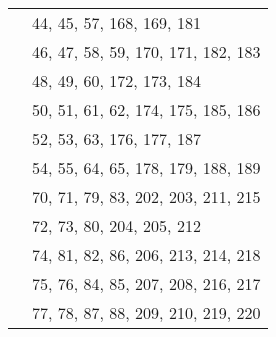 \begin{center}
\begin{longtabu}{|X[l]|X[2,l]|}
    &44, 45, 57, 168, 169, 181\\
    &46, 47, 58, 59, 170, 171, 182, 183\\
    &48, 49, 60, 172, 173, 184\\
    &50, 51, 61, 62, 174, 175, 185, 186\\
    &52, 53, 63, 176, 177, 187\\
    &54, 55, 64, 65, 178, 179, 188, 189\\
    &70, 71, 79, 83, 202, 203, 211, 215\\
    &72, 73, 80, 204, 205, 212\\
    &74, 81, 82, 86, 206, 213, 214, 218\\
    &75, 76, 84, 85, 207, 208, 216, 217\\
    &77, 78, 87, 88, 209, 210, 219, 220\\
    \hline
\end{longtabu}
\end{center}
\newpage
